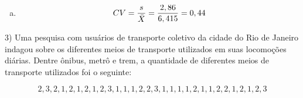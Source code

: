 \documentclass{article}
\begin{document}
\begin{enumerate}[a)]
{\tiny \begin{align*}
s^2 &= \dfrac{1}{20} ( (10,1 -6,415)^2 + (7,3 -6,415)^2 + (8,5 -6,415)^2 + (5,0 -6,415)^2 + (4,2 -6,415)^2 + (3,1 -6,415)^2 + (2,2 -6,415)^2+ \\
& + (9,0 -6,415)^2 + (9,4 -6,415)^2+ (6,1 -6,415)^2 + (3,3 -6,415)^2 + (10,7 -6,415)^2 + (1,5 -6,415)^2 + (8,2 -6,415)^2 +\\
&+(10,0  -6,415)^2+ (4,7 -6,415)^2 + (3,5 -6,415)^2 + (6,5 -6,415)^2 + (8,9 -6,415)^2 + (6,1 -6,415)^2) = 8,21
\end{align*}}

$$s = \sqrt{8,21} = 2,86$$

\item 

$$CV = \dfrac{s}{\Bar{X}} = \dfrac{2,86}{6,415} = 0,44$$
\end{enumerate}

3) Uma pesquisa com usuários de transporte coletivo da cidade do Rio de Janeiro indagou sobre os diferentes meios de transporte utilizados em suas locomoções diárias. Dentre ônibus, metrô e trem, a quantidade de diferentes meios de transporte utilizados foi o seguinte:

$$2, 3, 2, 1, 2, 1, 2, 1, 2, 3, 1, 1, 1, 2, 2, 3, 1, 1, 1, 1, 2, 1, 1, 2, 2, 1, 2,
1 ,2, 3 $$
\end{document}
